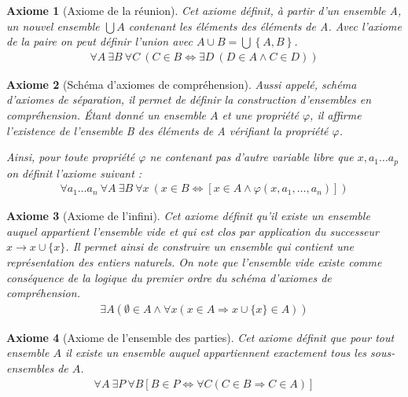 \documentclass[10pt,a4paper]{article}
\newtheorem{axiom}{Axiome}[section]
\begin{document}
\begin{axiom}[Axiome de la réunion] Cet axiome définit, à partir d'un ensemble A, un nouvel ensemble $\bigcup A$ contenant les éléments des éléments de A. Avec l'axiome de la paire on peut définir l'union avec $A \cup B = \bigcup \left\{A, B\right\}$.
\begin{align}
\forall A\ \exists B\ \forall C\ \left( C\in B \Leftrightarrow \exists D\ \left( D\in A \wedge C\in D \right) \right)
\end{align}
\end{axiom}


\begin{axiom}[Schéma d'axiomes de compréhension] Aussi appelé, schéma d'axiomes de séparation, il permet de définir la construction d'ensembles en compréhension. Étant donné un ensemble $A$ et une propriété $\varphi$, il affirme l'existence de l'ensemble B des éléments de A vérifiant la propriété $\varphi$.

Ainsi, pour toute propriété $\varphi$ ne contenant pas d'autre variable libre que $x, a_1 \ldots a_p$ on définit l'axiome suivant :
\begin{align}
\forall a_1 \ldots a_n \ \forall A \ \exists B \ \forall x \ \left( x \in B \Leftrightarrow \left[ x \in A \wedge \varphi \left(x, a_1, \ldots, a_n \right) \right] \right) 
\end{align}
\end{axiom}

\begin{axiom}[Axiome de l'infini] Cet axiome définit qu'il existe un ensemble auquel appartient l'ensemble vide et qui est clos par application du successeur$ x \rightarrow x \cup \{x\}$. Il permet ainsi de construire un ensemble qui contient une représentation des entiers naturels. On note que l'ensemble vide existe comme conséquence de la logique du premier ordre du schéma d'axiomes de compréhension.
\begin{align}
\exists A \left( \emptyset \in A \land \forall x (x \in A \Rightarrow x \cup \{x\} \in A) \right) 
\end{align}
\end{axiom}

\begin{axiom}[Axiome de l'ensemble des parties] Cet axiome définit que pour tout ensemble $A$ il existe un ensemble auquel appartiennent exactement tous les sous-ensembles de $A$.
\begin{align}
\forall A \ \exists P \ \forall B \left[B \in P \Leftrightarrow \forall C \left( C \in B \Rightarrow C \in A \right) \right] 
\end{align}
\end{axiom}
\end{document}
